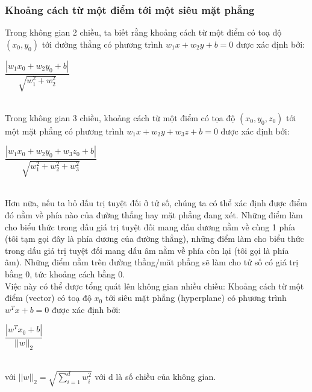 \documentclass[12pt,a4paper]{article}
\begin{document}
\subsubsection{Khoảng cách từ một điểm tới một siêu mặt phẳng}
Trong không gian 2 chiều, ta biết rằng khoảng cách từ một điểm có toạ độ $(x_0,y_0)$ tới đường thẳng có phương trình $w_{1}x+w_{2}y+b =0$
 được xác định bởi: \\
 \centerline{$\dfrac{|w_{1}x_{0}+w_{2}y_{0}+b|}{\sqrt{w_1^2+w_2^2}}$}\\
 Trong không gian 3 chiều, khoảng cách từ một điểm có tọa độ $(x_0,y_0,z_0)$ tới một mặt phẳng có phương trình $w_{1}x+w_{2}y+w_3z+b = 0$ được xác định bởi:\\
 \centerline{$\dfrac{|w_{1}x_{0}+w_{2}y_{0}+w_{3}z_{0} +b|}{\sqrt{w_1^2+w_2^2+w_3^2}}$}\\
 Hơn nữa, nếu ta bỏ dấu trị tuyệt đối ở tử số, chúng ta có thể xác định được điểm đó nằm về phía nào của đường thẳng hay mặt phẳng đang xét. Những điểm làm cho biểu thức trong dấu giá trị tuyệt đối mang dấu dương nằm về cùng 1 phía (tôi tạm gọi đây là phía dương của đường thẳng), những điểm làm cho biểu thức trong dấu giá trị tuyệt đối mang dấu âm nằm về phía còn lại (tôi gọi là phía âm). Những điểm nằm trên đường thẳng/măt phẳng sẽ làm cho tử số có giá trị bằng 0, tức khoảng cách bằng 0.\\
 Việc này có thể được tổng quát lên không gian nhiều chiều: Khoảng cách từ một điểm (vector) có toạ độ $x_0$ tới siêu mặt phẳng (hyperplane) có phương trình $w^Tx+b=0$ được xác định bởi:\\
 \centerline{$\dfrac{|w^Tx_0+b|}{||w||_2}$}\\
 với $||w||_2 = \sqrt{\sum_{i=1}^{d}w_i^2 }$ với d là số chiều của không gian.\\
\end{document}
